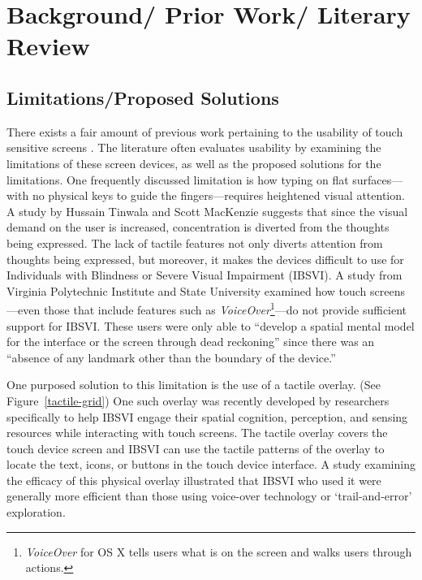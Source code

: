 \documentclass[11pt]{article}
\begin{document}
\section{Background/ Prior Work/ Literary Review}
\label{background}
\subsection{Limitations/Proposed Solutions}
There exists a fair amount of previous work pertaining to the usability of touch sensitive screens
\cite{Tinwala:2010:ETE:1868914.1868972,El-Glaly:2013:TTF:2460625.2460665}. %
The literature often evaluates usability by examining the limitations of these screen devices, as well as the proposed solutions for the limitations. One frequently discussed limitation is how typing on flat surfaces---with no physical keys to guide the fingers---requires heightened visual attention. A study by Hussain Tinwala and Scott MacKenzie suggests that since the visual demand on the user is increased, concentration is diverted from the thoughts being expressed. \cite{Tinwala:2010:ETE:1868914.1868972} The lack of tactile features not only diverts attention from thoughts being expressed, but moreover, it makes the devices difficult to use for Individuals with Blindness or Severe Visual Impairment (IBSVI). A study from Virginia Polytechnic Institute and State University examined how touch screens---even those that include features such as  \textit{VoiceOver}\footnote{\textit{VoiceOver} for OS X tells users what is on the screen and walks users through actions.\cite{VoiceOver}}---do not provide sufficient support for IBSVI. These users were only able to ``develop a spatial mental model for the interface or the screen through dead reckoning'' since there was an ``absence of any landmark other than the boundary of the device.'' \cite{El-Glaly:2013:TTF:2460625.2460665} 

One purposed solution to this limitation is the use of a tactile overlay. (See Figure~\ref{tactile-grid}) One such overlay was recently developed by researchers specifically to help IBSVI engage their spatial cognition, perception, and sensing resources while interacting with touch screens.  \cite{El-Glaly:2013:TTF:2460625.2460665} The tactile overlay covers the touch device screen and IBSVI can use the tactile patterns of the overlay to locate the text, icons, or buttons in the touch device interface. A study examining the efficacy of this physical overlay illustrated that IBSVI who used it were generally more efficient than those using voice-over technology or `trail-and-error' exploration. \cite{El-Glaly:2013:TTF:2460625.2460665}
\end{document}
